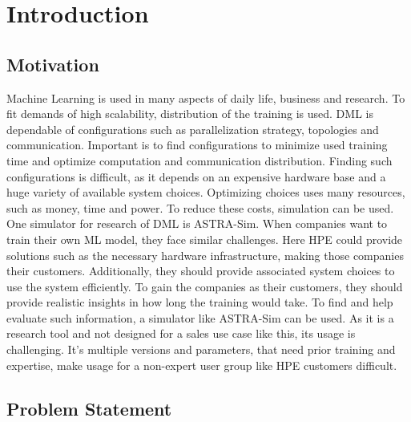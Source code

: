 
\chapter{Introduction} %


\section{Motivation}
Machine Learning is used in many aspects of daily life, business and research. To fit demands of high scalability, distribution of the training is used. 
\ac{DML} is dependable of configurations such as parallelization strategy, topologies and communication. Important is to find configurations to minimize used training time and optimize computation and communication distribution.
Finding such configurations is difficult, as it depends on an expensive hardware base and a huge variety of available system choices. Optimizing choices uses many resources, such as money, time and power. To reduce these costs, simulation can be used. One simulator for research of \ac{DML} is \ac{ASTRA-Sim}. 
When companies want to train their own \ac{ML} model, they face similar challenges. Here \ac{HPE} could provide solutions such as the necessary hardware infrastructure, making those companies their customers. Additionally, they should provide associated system choices to use the system efficiently. To gain the companies as their customers, they should provide realistic insights in how long the training would take. To find and help evaluate such information, a simulator like \ac{ASTRA-Sim} can be used. 
As it is a research tool and not designed for a sales use case like this, its usage is challenging. It's multiple versions and parameters, that need prior training and expertise, make usage for a non-expert user group like \ac{HPE} customers difficult.

\section{Problem Statement}

